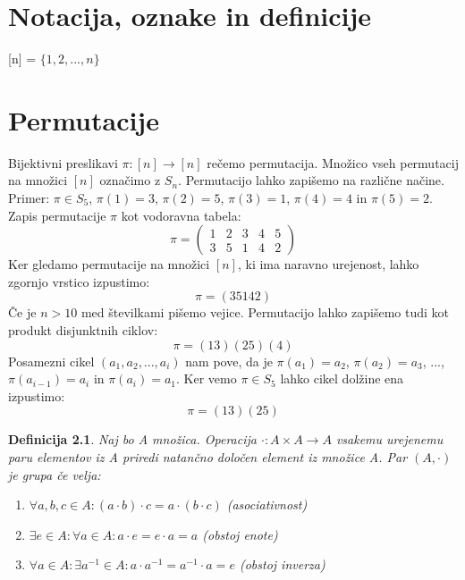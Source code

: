\documentclass[a4paper, 12pt]{book}
\newtheorem{definicija}{Definicija}[chapter]
\begin{document}
\chapter{ Notacija, oznake in definicije }
[n] = $\{ 1, 2,..., n\}$

\chapter{ Permutacije }
Bijektivni preslikavi $\pi: [n] \rightarrow [n]$ rečemo permutacija. 
Množico vseh permutacij na množici $[n]$ označimo z $S_n$.
Permutacijo lahko zapišemo na različne načine. 
Primer: $\pi \in S_5$, $\pi(1) = 3$, $\pi(2) = 5$, $\pi(3) = 1$, $\pi(4) = 4$ in $\pi(5) = 2$.
Zapis permutacije $\pi$ kot vodoravna tabela:
\[
    \pi = \begin{pmatrix}
        1 & 2 & 3 & 4 & 5 \\
        3 & 5 & 1 & 4 & 2
    \end{pmatrix}
\]
Ker gledamo permutacije na množici $[n]$, ki ima naravno urejenost, lahko zgornjo vrstico izpustimo:
\[
    \pi = (3 5 1 4 2)
\]
Če je $n > 10$ med številkami pišemo vejice.
Permutacijo lahko zapišemo tudi kot produkt disjunktnih ciklov:
\[
    \pi = (1 3)(2 5)(4)
\]
Posamezni cikel $(a_1, a_2, ..., a_i)$ nam pove, da je $\pi(a_1) = a_2$, $\pi(a_2) = a_3$, ..., $\pi(a_{i-1}) = a_i$ in $\pi(a_i) = a_1$.
Ker vemo $\pi \in S_5$ lahko cikel dolžine ena izpustimo:
\[
    \pi = (1 3)(2 5)
\]

\begin{definicija}
    Naj bo A množica. 
    Operacija $\cdot:A \times A \rightarrow A$ vsakemu urejenemu paru elementov iz A priredi natančno določen element iz množice A. 
    Par $(A, \cdot)$ je grupa če velja:
    \begin{enumerate}
        \item $\forall a, b, c \in A: (a \cdot b) \cdot c = a \cdot (b \cdot c)$ (asociativnost)
        \item $\exists e \in A: \forall a \in A: a \cdot e = e \cdot a = a$ (obstoj enote)
        \item $\forall a \in A: \exists a^{-1} \in A: a \cdot a^{-1} = a^{-1} \cdot a = e$ (obstoj inverza)
        
    \end{enumerate}

\end{definicija}
\end{document}
